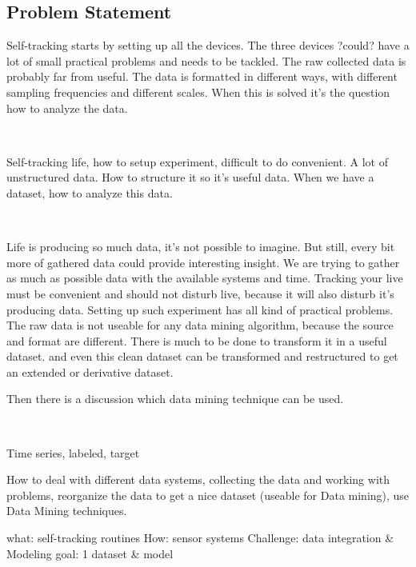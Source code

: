 	\subsection{Problem Statement}
		Self-tracking starts by setting up all the devices. The three devices ?could? have a lot of small practical problems and needs to be tackled. The raw collected data is probably far from useful. The data is formatted in different ways, with different sampling frequencies and different scales. When this is solved it's the question how to analyze the data.

		\

		Self-tracking life, how to setup experiment, difficult to do convenient. A lot of unstructured data. How to structure it so it's useful data. 
		When we have a dataset, how to analyze this data. 

		\

		Life is producing so much data, it's not possible to imagine. But still, every bit more of gathered data could provide interesting insight. We are trying to gather as much as possible data with the available systems and time. Tracking your live must be convenient and should not disturb live, because it will also disturb it's producing data. Setting up such experiment has all kind of practical problems. The raw data is not useable for any data mining algorithm, because the source and format are different. There is much to be done to transform it in a useful dataset. and even this clean dataset can be transformed and restructured to get an extended or derivative dataset. 

		Then there is a discussion which data mining technique can be used. 


		\
			
		Time series, labeled, target

		How to deal with different data systems, collecting the data and working with problems, reorganize the data to get a nice dataset (useable for Data mining), use Data Mining techniques.

		what: self-tracking routines
		How: sensor systems
		Challenge: data integration \& Modeling
		goal: 1 dataset \& model

